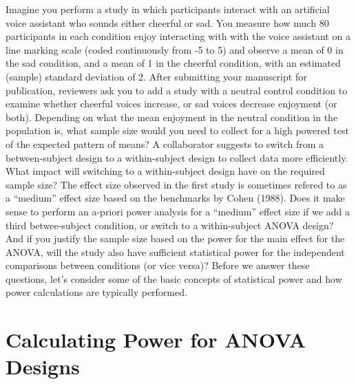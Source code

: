 \documentclass[
  ,jou,floatsintext]{apa6}
\begin{document}
Imagine you perform a study in which participants interact with an artificial voice assistant who sounds either cheerful or sad.
You measure how much 80 participants in each condition enjoy interacting with with the voice assistant on a line marking scale (coded continuously from -5 to 5) and observe a mean of 0 in the sad condition, and a mean of 1 in the cheerful condition, with an estimated (sample) standard deviation of 2.
After submitting your manuscript for publication, reviewers ask you to add a study with a neutral control condition to examine whether cheerful voices increase, or sad voices decrease enjoyment (or both).
Depending on what the mean enjoyment in the neutral condition in the population is, what sample size would you need to collect for a high powered test of the expected pattern of means?
A collaborator suggests to switch from a between-subject design to a within-subject design to collect data more efficiently.
What impact will switching to a within-subject design have on the required sample size?
The effect size observed in the first study is sometimes refered to as a \enquote{medium} effect size based on the benchmarks by Cohen (1988).
Does it make sense to perform an a-priori power analysis for a \enquote{medium} effect size if we add a third betwee-subject condition, or switch to a within-subject ANOVA design?
And if you justify the sample size based on the power for the main effect for the ANOVA, will the study also have sufficient statistical power for the independent comparisons between conditions (or vice versa)?
Before we answer these questions, let's consider some of the basic concepts of statistical power and how power calculations are typically performed.

\hypertarget{calculating-power-for-anova-designs}{%
\section{Calculating Power for ANOVA Designs}\label{calculating-power-for-anova-designs}}
\end{document}
